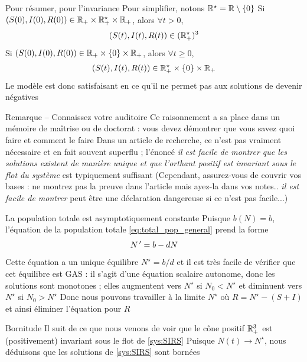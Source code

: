 \documentclass[aspectratio=169]{beamer}\usepackage[]{graphicx}\usepackage[]{xcolor}
\begin{document}
\begin{frame}{Pour résumer, pour l'invariance}
Pour simplifier, notons $\mathbb{R}^\star=\mathbb{R}\setminus\{0\}$
\vfill
\bbullet Si $(S(0),I(0),R(0))\in\mathbb{R}_+\times \mathbb{R}_+^\star\times\mathbb{R}_+$, alors $\forall t>0$,
\[
(S(t),I(t),R(t))\in(\mathbb{R}_+^\star)^3
\]
\vfill
\bbullet Si $(S(0),I(0),R(0))\in\mathbb{R}_+\times\{0\}\times\mathbb{R}_+$, alors $\forall t\geq 0$, 
\[
(S(t),I(t),R(t))\in\mathbb{R}_+^\star\times\{0\}\times\mathbb{R}_+
\]
\vfill
Le modèle est donc satisfaisant en ce qu'il ne permet pas aux solutions de devenir négatives
\end{frame}

\begin{frame}{Remarque -- Connaissez votre auditoire}
Ce raisonnement a sa place dans un mémoire de maîtrise ou de doctorat : vous devez démontrer que vous savez quoi faire et comment le faire
\vfill
Dans un article de recherche, ce n'est pas vraiment nécessaire et en fait souvent superflu ; l'énoncé \emph{il est facile de montrer que les solutions existent de manière unique et que l'orthant positif est invariant sous le flot du système} est typiquement suffisant
\vfill
(Cependant, assurez-vous de couvrir vos bases : ne montrez pas la preuve dans l'article mais ayez-la dans vos notes.. \emph{il est facile de montrer} peut être une déclaration dangereuse si ce n'est pas facile...)
\end{frame}


\begin{frame}{La population totale est asymptotiquement constante}
Puisque $b(N)=b$, l'équation de la population totale \eqref{eq:total_pop_general} prend la forme
\[
N\,' = b-dN
\]
Cette équation a un unique équilibre $N^\star=b/d$ et il est très facile de vérifier que cet équilibre est GAS : il s'agit d'une équation scalaire autonome, donc les solutions sont monotones ; elles augmentent vers $N^\star$ si $N_0<N^\star$ et diminuent vers $N^\star$ si $N_0>N^\star$
\vfill
Donc nous pouvons travailler à la limite $N^\star$ où $R=N^\star-(S+I)$ et ainsi éliminer l'équation pour $R$
\end{frame}


\begin{frame}{Bornitude}
Il suit de ce que nous venons de voir que le cône positif $\mathbb{R}_+^3$ est (positivement) invariant sous le flot de \eqref{sys:SIRS}
\vfill
Puisque $N(t)\to N^\star$, nous déduisons que les solutions de \eqref{sys:SIRS} sont bornées
\end{frame}
\end{document}
